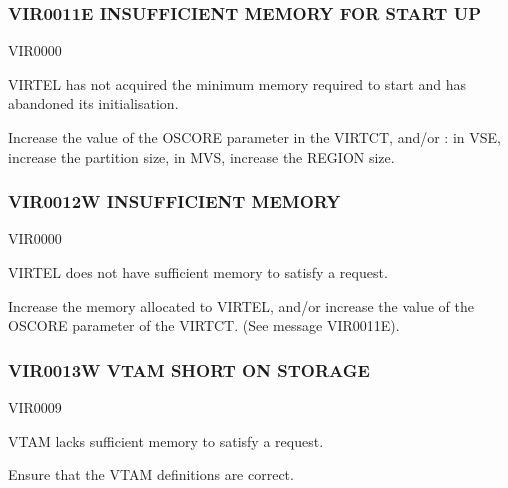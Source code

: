 \documentclass[letterpaper,10pt,english]{sphinxmanual}
\begin{document}
\subsubsection{VIR0011E INSUFFICIENT MEMORY FOR START UP}
\label{\detokenize{messages:vir0011e-insufficient-memory-for-start-up}}\begin{description}
\sphinxAtStartPar
VIR0000

\sphinxAtStartPar
VIRTEL has not acquired the minimum memory required to start and has abandoned its initialisation.

\sphinxAtStartPar
Increase the value of the OSCORE parameter in the VIRTCT, and/or :
\sphinxhyphen{} in VSE, increase the partition size,
\sphinxhyphen{} in MVS, increase the REGION size.

\end{description}


\subsubsection{VIR0012W INSUFFICIENT MEMORY}
\label{\detokenize{messages:vir0012w-insufficient-memory}}\begin{description}
\sphinxAtStartPar
VIR0000

\sphinxAtStartPar
VIRTEL does not have sufficient memory to satisfy a request.

\sphinxAtStartPar
Increase the memory allocated to VIRTEL, and/or increase the value of the OSCORE parameter of the VIRTCT. (See message VIR0011E).

\end{description}


\subsubsection{VIR0013W VTAM SHORT ON STORAGE}
\label{\detokenize{messages:vir0013w-vtam-short-on-storage}}\begin{description}
\sphinxAtStartPar
VIR0009

\sphinxAtStartPar
VTAM lacks sufficient memory to satisfy a request.

\sphinxAtStartPar
Ensure that the VTAM definitions are correct.

\end{description}
\end{document}
